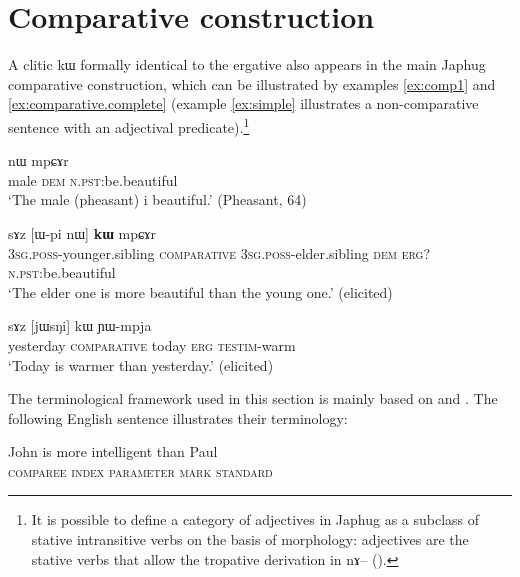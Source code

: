 \documentclass[oldfontcommands,oneside,a4paper,11pt]{article}
\newcommand{\ipa}[1]{{\phon #1}} %
\begin{document}
\section{Comparative construction} \label{sec:comparative}

A clitic \ipa{kɯ} formally identical to the ergative also appears in the main Japhug comparative construction, which can be illustrated by   examples \ref{ex:comp1} and \ref{ex:comparative.complete} (example \ref{ex:simple} illustrates a non-comparative sentence with an adjectival predicate).\footnote{It is possible to define a category of adjectives in Japhug as a subclass of stative intransitive verbs on the basis of morphology: adjectives are the stative verbs that allow the tropative derivation in \ipa{nɤ--} (\citealt{jacques13tropative}).}  

\begin{exe}
\ex \label{ex:simple}
\gll  \ipa{pʰu}   	\ipa{nɯ}   \ipa{mpɕɤr}     \\
  male \textsc{dem}    \textsc{n.pst:}be.beautiful \\
\glt `The male (pheasant) i   beautiful.' (Pheasant, 64)
\end{exe}

\begin{exe}
\ex \label{ex:comp1}
\gll  \ipa{ɯ-ʁi}   	\ipa{sɤz}   	[\ipa{ɯ-pi}   	\ipa{nɯ}]   	\ipa{\textbf{kɯ}}   	\ipa{mpɕɤr}     \\
\textsc{3sg.poss}-younger.sibling \textsc{comparative} \textsc{3sg.poss}-elder.sibling \textsc{dem} \textsc{erg?}  \textsc{n.pst:}be.beautiful \\
\glt `The elder one is more beautiful than the young one.' (elicited)
\end{exe}
 
 
\begin{exe}
\ex \label{ex:comparative.complete}
\gll \ipa{jɯfɕɯr}   	\ipa{sɤz }   	[\ipa{jɯsŋi}]   	\ipa{kɯ}   	\ipa{ɲɯ-mpja}   \\
yesterday \textsc{comparative} today \textsc{erg} \textsc{testim}-warm \\
\glt `Today is warmer than yesterday.' (elicited)
\end{exe}

The terminological framework used in this section is mainly based on \citet{dixon08comparative} and \citet{stassen11comparative}. The following English sentence   illustrates their  terminology:

\begin{exe}
\ex \label{ex:comp.eng}
\gll  John is more intelligent than Paul \\
\textsc{comparee} { } \textsc{index} \textsc{parameter} \textsc{mark} \textsc{standard}  \\
\end{exe}
\end{document}
